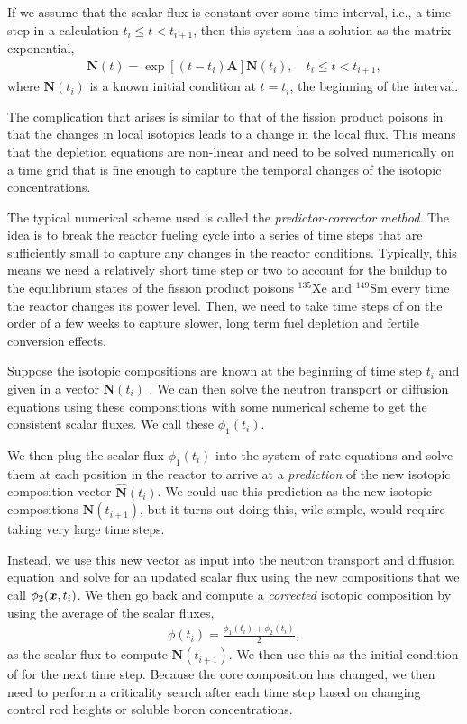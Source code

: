 If we assume that the scalar flux is constant over some time interval, i.e., a time step in a calculation $t_i \le t < t_{i+1}$, then this system has a solution as the matrix exponential,
\begin{align}
  \mathbf{N}(t) = \exp\left[ (t-t_i) \mathbf{A} \right] \mathbf{N}(t_i) , \quad t_i \le t < t_{i+1} ,
\end{align}
where $\mathbf{N}(t_i)$ is a known initial condition at $t = t_i$, the beginning of the interval.

The complication that arises is similar to that of the fission product poisons in that the changes in local isotopics leads to a change in the local flux. This means that the depletion equations are non-linear and need to be solved numerically on a time grid that is fine enough to capture the temporal changes of the isotopic concentrations. 

The typical numerical scheme used is called the \emph{predictor-corrector method}. The idea is to break the reactor fueling cycle into a series of time steps that are sufficiently small to capture any changes in the reactor conditions. Typically, this means we need a relatively short time step or two to account for the buildup to the equilibrium states of the fission product poisons $^{135}$Xe and $^{149}$Sm every time the reactor changes its power level. Then, we need to take time steps of on the order of a few weeks to capture slower, long term fuel depletion and fertile conversion effects.

Suppose the isotopic compositions are known at the beginning of time step $t_i$ and given in a vector $\mathbf{N}(t_i)$ . We can then solve the neutron transport or diffusion equations using these componsitions with some numerical scheme to get the consistent scalar fluxes. We call these $\phi_1(t_i)$.

We then plug the scalar flux $\phi_1(t_i)$ into the system of rate equations and solve them at each position in the reactor to arrive at a \emph{prediction} of the new isotopic composition vector $\hat{\mathbf{N}}(t_i)$. We could use this prediction as the new isotopic compositions $\mathbf{N}(t_{i+1})$, but it turns out doing this, wile simple, would require taking very large time steps.

Instead, we use this new vector as input into the neutron transport and diffusion equation and solve for an updated scalar flux using the new compositions that we call $\phi_2(\bm{x},t_i)$. We then go back and compute a \emph{corrected} isotopic composition by using the average of the scalar fluxes,
\begin{align}
  \phi(t_i) = \frac{ \phi_1(t_i) + \phi_2(t_i) }{ 2 } ,
\end{align}
as the scalar flux to compute $\mathbf{N}(t_{i+1})$. We then use this as the initial condition of for the next time step. Because the core composition has changed, we then need to perform a criticality search after each time step based on changing control rod heights or soluble boron concentrations.


